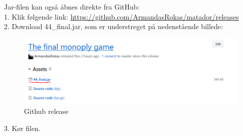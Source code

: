 \documentclass[class=article, crop=false]{standalone}
\begin{document}
    Jar-filen kan også åbnes direkte fra GitHub: \\
    1. Klik følgende link: \url{https://github.com/ArmandasRokas/matador/releases}\\
2. Download 44\_final.jar, som er understreget på nedenstående billede:
    \begin{figure}[H]
        \centering
        \includegraphics[scale=0.7]{pics/vejledning}
        \caption{Github release}\label{fig:vejledning}
    \end{figure}
3. Kør filen.
\end{document}
